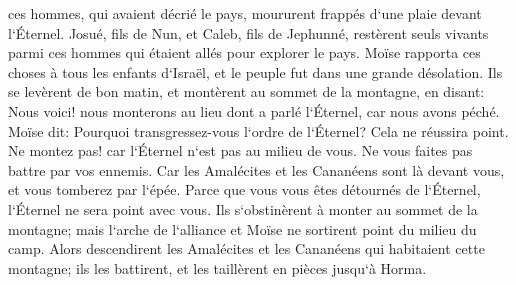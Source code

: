 \verse ces hommes, qui avaient décrié le pays, moururent frappés d`une plaie devant l`Éternel. 
\verse Josué, fils de Nun, et Caleb, fils de Jephunné, restèrent seuls vivants parmi ces hommes qui étaient allés pour explorer le pays. 
\verse Moïse rapporta ces choses à tous les enfants d`Israël, et le peuple fut dans une grande désolation. 
\verse Ils se levèrent de bon matin, et montèrent au sommet de la montagne, en disant: Nous voici! nous monterons au lieu dont a parlé l`Éternel, car nous avons péché. 
\verse Moïse dit: Pourquoi transgressez-vous l`ordre de l`Éternel? Cela ne réussira point. 
\verse Ne montez pas! car l`Éternel n`est pas au milieu de vous. Ne vous faites pas battre par vos ennemis. 
\verse Car les Amalécites et les Cananéens sont là devant vous, et vous tomberez par l`épée. Parce que vous vous êtes détournés de l`Éternel, l`Éternel ne sera point avec vous. 
\verse Ils s`obstinèrent à monter au sommet de la montagne; mais l`arche de l`alliance et Moïse ne sortirent point du milieu du camp. 
\verse Alors descendirent les Amalécites et les Cananéens qui habitaient cette montagne; ils les battirent, et les taillèrent en pièces jusqu`à Horma. 

\chapter{}


